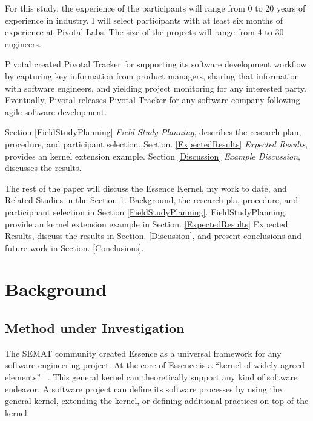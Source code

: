 \documentclass[preprint,12pt,3p]{elsarticle}
\begin{document}
For this study, the experience of the participants will range from 0 to 20 years of experience in industry. I will select participants with at least six months of experience at Pivotal Labs. The size of the projects will range from 4 to 30 engineers.

Pivotal created Pivotal Tracker for supporting its software development workflow by capturing key information from product managers, sharing that information with software engineers, and yielding project monitoring for any interested party. Eventually, Pivotal releases Pivotal Tracker for any software company following agile software development.

Section \ref{FieldStudyPlanning} \textit{Field Study Planning}, describes the research plan, procedure, and participant selection. Section. \ref{ExpectedResults} \textit{Expected Results}, provides an kernel extension example. Section \ref{Discussion} \textit{Example Discussion}, discusses the results. 

The rest of the paper will discuss the Essence Kernel, my work to date, and Related Studies in the Section \ref{Background}. Background, the research pla, procedure, and participnant selection in Section \ref{FieldStudyPlanning}. FieldStudyPlanning, provide an kernel extension example in Section. \ref{ExpectedResults} Expected Results, discuss the results in Section. \ref{Discussion}, and present conclusions and future work in Section. \ref{Conclusions}.

\section{Background}
\label{Background}

\subsection{Method under Investigation}
The SEMAT community created Essence as a universal framework for any software engineering project. At the core of Essence is a ``kernel of widely-agreed elements'' ~\cite{JacobsonQueue}. This general kernel can theoretically support any kind of software endeavor. A software project can define its software processes by using the general kernel, extending the kernel, or defining additional practices on top of the kernel.
\end{document}

